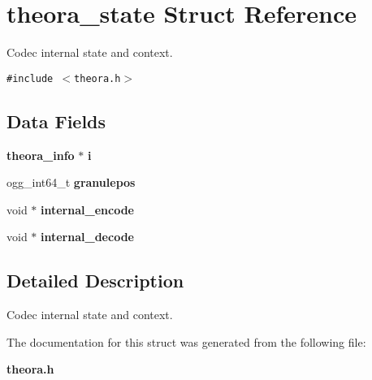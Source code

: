 \section{theora\_\-state Struct Reference}
\label{structtheora__state}
Codec internal state and context.  


{\tt \#include $<$theora.h$>$}

\subsection*{Data Fields}
\begin{CompactItemize}
\item 
{\bf theora\_\-info} $\ast$ {\bf i}\label{structtheora__state_6b5096e702a26e3a9b526908357bf17f}

\item 
ogg\_\-int64\_\-t {\bf granulepos}\label{structtheora__state_38c865281bf523d0af82c6a7da574c40}

\item 
void $\ast$ {\bf internal\_\-encode}\label{structtheora__state_3cfd040487f5caf89b6ecea3122c90ab}

\item 
void $\ast$ {\bf internal\_\-decode}\label{structtheora__state_7652f35bc3c0c8000aaf942b5c60d5bc}

\end{CompactItemize}


\subsection{Detailed Description}
Codec internal state and context. 



The documentation for this struct was generated from the following file:\begin{CompactItemize}
\item 
{\bf theora.h}\end{CompactItemize}
